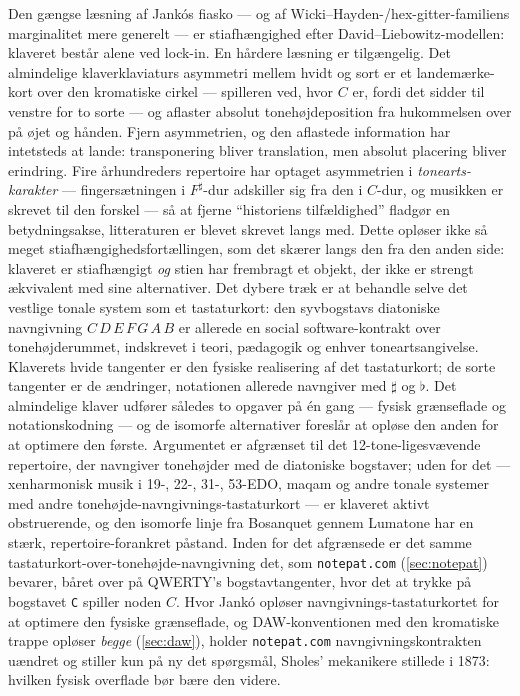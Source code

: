 \documentclass[10pt,letterpaper,twocolumn]{article}
\begin{document}
Den gængse læsning af Jankós fiasko --- og af Wicki--Hayden-/hex-gitter-familiens marginalitet mere generelt --- er stiafhængighed efter David--Liebowitz-modellen: klaveret består alene ved lock-in. En hårdere læsning er tilgængelig. Det almindelige klaverklaviaturs asymmetri mellem hvidt og sort er et landemærke-kort over den kromatiske cirkel --- spilleren ved, hvor $C$ er, fordi det sidder til venstre for to sorte --- og aflaster absolut tonehøjdeposition fra hukommelsen over på øjet og hånden. Fjern asymmetrien, og den aflastede information har intetsteds at lande: transponering bliver translation, men absolut placering bliver erindring. Fire århundreders repertoire har optaget asymmetrien i \emph{tonearts-karakter} --- fingersætningen i $F^\sharp$-dur adskiller sig fra den i $C$-dur, og musikken er skrevet til den forskel --- så at fjerne ``historiens tilfældighed'' fladgør en betydningsakse, litteraturen er blevet skrevet langs med. Dette opløser ikke så meget stiafhængighedsfortællingen, som det skærer langs den fra den anden side: klaveret er stiafhængigt \emph{og} stien har frembragt et objekt, der ikke er strengt ækvivalent med sine alternativer. Det dybere træk er at behandle selve det vestlige tonale system som et tastaturkort: den syvbogstavs diatoniske navngivning $C\,D\,E\,F\,G\,A\,B$ er allerede en social software-kontrakt over tonehøjderummet, indskrevet i teori, pædagogik og enhver toneartsangivelse. Klaverets hvide tangenter er den fysiske realisering af det tastaturkort; de sorte tangenter er de ændringer, notationen allerede navngiver med $\sharp$ og $\flat$. Det almindelige klaver udfører således to opgaver på én gang --- fysisk grænseflade og notationskodning --- og de isomorfe alternativer foreslår at opløse den anden for at optimere den første. Argumentet er afgrænset til det 12-tone-ligesvævende repertoire, der navngiver tonehøjder med de diatoniske bogstaver; uden for det --- xenharmonisk musik i 19-, 22-, 31-, 53-EDO, maqam og andre tonale systemer med andre tonehøjde-navngivnings-tastaturkort --- er klaveret aktivt obstruerende, og den isomorfe linje fra Bosanquet gennem Lumatone har en stærk, repertoire-forankret påstand. Inden for det afgrænsede er det samme tastaturkort-over-tonehøjde-navngivning det, som \texttt{notepat.com} (\textsection\ref{sec:notepat}) bevarer, båret over på QWERTY's bogstavtangenter, hvor det at trykke på bogstavet \texttt{C} spiller noden $C$. Hvor Jankó opløser navngivnings-tastaturkortet for at optimere den fysiske grænseflade, og DAW-konventionen med den kromatiske trappe opløser \emph{begge} (\textsection\ref{sec:daw}), holder \texttt{notepat.com} navngivningskontrakten uændret og stiller kun på ny det spørgsmål, Sholes' mekanikere stillede i 1873: hvilken fysisk overflade bør bære den videre.
\end{document}
